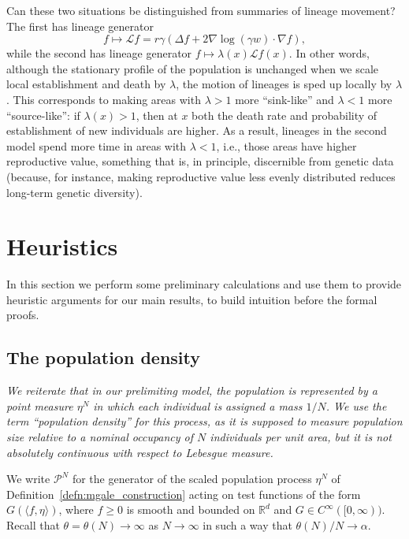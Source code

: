 \documentclass[EJP]{ejpecp} %
\newcommand{\IR}{\mathbb R}
\newcommand{\grad}{\nabla}
\newcommand{\Lgen}{\mathcal{L}}    %
\newcommand{\Pgen}{\mathcal{P}}    %
\begin{document}
Can these two situations be distinguished from summaries of lineage movement?
The first has lineage generator
\[
    f \mapsto \Lgen f = r \gamma \left( \Delta f + 2 \grad \log(\gamma w) \cdot \grad f \right),
\]
while the second has lineage generator $f \mapsto \lambda(x) \Lgen f(x)$.
In other words,
although the stationary profile of the population is unchanged when we scale
local establishment and death by $\lambda$,
the motion of lineages is sped up locally by $\lambda$.
This corresponds to making areas with $\lambda > 1$ more ``sink-like'' 
and $\lambda < 1$ more ``source-like'':
if $\lambda(x) > 1$, then at $x$ both the death rate and probability of 
establishment of new individuals are higher.
As a result, lineages in the second model spend more time in areas with $\lambda < 1$,
i.e., those areas have higher reproductive value,
something that is, in principle, discernible from genetic data
(because, for instance, making reproductive value less evenly distributed
reduces long-term genetic diversity). 


\section{Heuristics}
    \label{sec:heuristics}

In this section we perform some preliminary calculations and use them 
to provide heuristic arguments for our main results,
to build intuition before the formal proofs.

\subsection{The population density}
    \label{sec:population_heuristics}

{\em We reiterate that in our prelimiting model,
the population is represented by a point measure $\eta^N$ in which each
individual is assigned a mass $1/N$. We use the term ``population density'' for
this process, as it is supposed to measure population size relative to a 
nominal occupancy of $N$ individuals per unit area, but it is not
absolutely continuous with respect to Lebesgue measure.}

We write $\Pgen^N$
for the generator of the scaled population process $\eta^N$
of Definition~\ref{defn:mgale_construction}
acting on test functions of the form $G( \langle f, \eta \rangle )$,
where $f \geq 0$ is smooth and bounded on $\IR^d$ and 
$G \in C^\infty ([0,\infty))$.
Recall that $\theta =\theta(N) \to \infty$ as $N\to\infty$ in such 
a way that $\theta(N)/N\to\alpha$.
\end{document}
